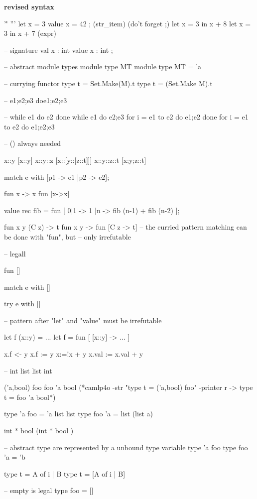 \item \textbf{revised syntax}
\begin{alternate}
  '\''
  '''
  let x = 3
  value  x = 42 ; (str_item) (do't forget ;)
  let x = 3 in x + 8
  let x = 3 in x + 7 (expr)

  -- signature
  val x : int
  value x : int ;

  -- abstract module types
  module type MT
  module type MT = 'a

  -- currying functor 
  type t = Set.Make(M).t
  type t = (Set.Make M).t

  --
  e1;e2;e3
  do{e1;e2;e3}

  --
  while e1 do e2 done
  while e1 do {e2;e3 }
  for i = e1 to e2 do e1;e2 done
  for i = e1 to e2 do {e1;e2;e3}

  --
  () always needed

  x::y
  [x::y]
  x::y::z
  [x::[y::[z::t]]]
  x::y::z::t
  [x;y;z::t]

  match e with
  [p1 -> e1
  |p2 -> e2];


  fun x -> x
  fun [x->x]

  
  value rec  fib = fun [
  0|1  -> 1 
  |n -> fib (n-1) + fib (n-2)
  ];


  fun x y (C z) -> t
  fun x y -> fun [C z -> t]
  -- the curried pattern matching can be done with "fun", but
  -- only irrefutable

  -- legall

  fun []

  match e with []

  try e with []


  -- pattern after "let" and "value" must be irrefutable

  let f (x::y) = ...
  let f = fun [ [x::y] ->  ... ]


  x.f <- y
  x.f := y
  x:=!x + y
  x.val := x.val + y

  --
  int list
  list int


  ('a,bool) foo
  foo 'a bool (*camlp4o -str "type t = ('a,bool) foo" -printer r  -> type t = foo 'a bool*)

  type 'a foo = 'a list list
  type foo 'a = list (list a)

  int * bool
  (int * bool )


  -- abstract type are represented by a unbound type variable
  type 'a foo
  type foo 'a = 'b

  type t = A of i | B
  type t = [A of i | B]


  -- empty is legal
  type foo = []



\end{alternate}
